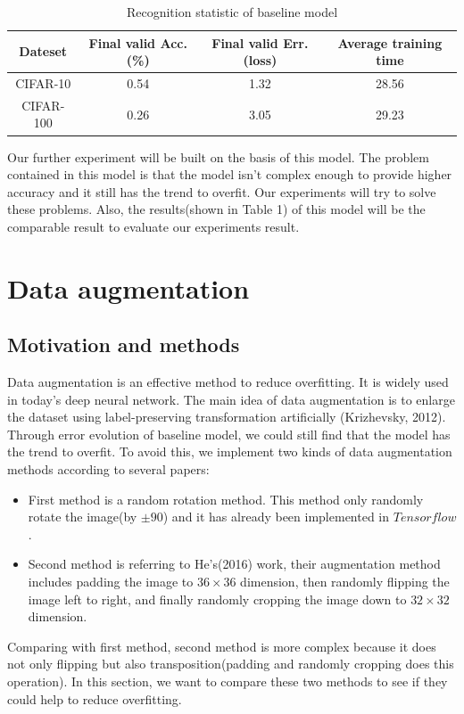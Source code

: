 \documentclass[]{article}
\begin{document}
\begin{table}[ht]
\centering 
\caption{Recognition statistic of baseline model}
\begin{tabular}{c c c c}
\toprule
Dateset & Final valid Acc.(\%) & Final valid Err.(loss) & Average training time\\
\midrule
CIFAR-10 & 0.54 & 1.32 & 28.56 \\
CIFAR-100 & 0.26 & 3.05 & 29.23  \\
\bottomrule
\end{tabular}
\end{table} 


Our further experiment will be built on the basis of this model. The problem contained in this model is that the model isn't complex enough to provide higher accuracy and it still has the trend to overfit. Our experiments will try to solve these problems. Also, the results(shown in Table 1) of this model will be the comparable result to evaluate our experiments result.
\section{Data augmentation}
\subsection{Motivation and methods}
Data augmentation is an effective method to reduce overfitting. It is widely used in today's deep neural network. The main idea of data augmentation is to enlarge the dataset using label-preserving transformation artificially (Krizhevsky, 2012). Through error evolution of baseline model, we could still find that the model has the trend to overfit. To avoid this, we implement two kinds of data augmentation methods according to several papers:

\begin{itemize}
\item First method is a random rotation method. This method only randomly rotate the image(by $\pm 90$\textdegree) and it has already been implemented in $Tensorflow$.
\item Second method is referring to He's(2016) work, their augmentation method includes padding the image to $36 \times 36$ dimension, then randomly flipping the image left to right, and finally randomly cropping the image down to $32 \times 32$ dimension.
\end{itemize}

Comparing with first method, second method is more complex because it does not only flipping but also transposition(padding and randomly cropping does this operation). In this section, we want to compare these two methods to see if they could help to reduce overfitting.
\end{document}
